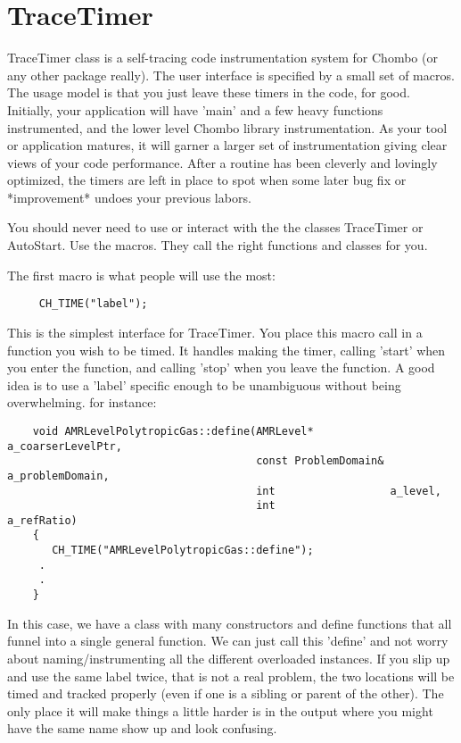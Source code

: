 \section{TraceTimer}

     TraceTimer class is a self-tracing code instrumentation system
     for Chombo (or any other package really).  The user interface is specified
     by a small set of macros.  The usage model is that you just leave these
     timers in the code, for good.  Initially, your application will have 'main'
     and a few heavy functions instrumented, and the lower level Chombo library
     instrumentation.  As your tool or application matures, it
     will garner a larger set of instrumentation giving clear views of your
     code performance.  After a routine has been
     cleverly and lovingly optimized, the timers are left in place to spot when
     some later bug fix or *improvement* undoes your previous labors. 

     You should never need to use or interact with the the classes TraceTimer or
     AutoStart.  Use the macros. They call the right functions and classes for you.

     The first macro is what people will use the most:
\begin{verbatim}
     CH_TIME("label");
\end{verbatim}

     This is the simplest interface for TraceTimer.  You place this macro call in a function
     you wish to be timed.  It handles making the timer, calling 'start' when you
     enter the function, and calling 'stop' when you leave the function.  A good
     idea is to use a 'label' specific enough to be unambiguous without being
     overwhelming.  for instance:

\begin{verbatim}
    void AMRLevelPolytropicGas::define(AMRLevel*            a_coarserLevelPtr,
                                       const ProblemDomain& a_problemDomain,
                                       int                  a_level,
                                       int                  a_refRatio)
    {  
       CH_TIME("AMRLevelPolytropicGas::define");
     .
     .
    }
\end{verbatim}
     
     In this case, we have a class with many constructors and define functions that
     all funnel into a single general function.  We can just call this 'define' and
     not worry about naming/instrumenting all the different overloaded instances. If
     you slip up and use the same label twice, that is not a real problem, the two
     locations will be timed and tracked properly (even if one is a sibling or parent
     of the other). The only place it will make things a little harder is in the output
     where you might have the same name show up and look confusing.
   
